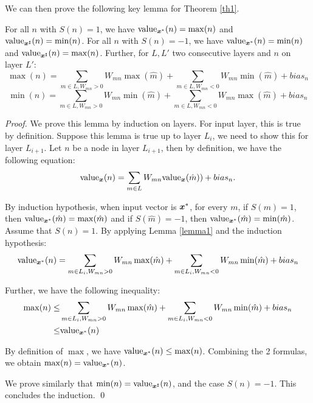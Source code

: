 We can then prove the following key lemma for Theorem \ref{th1}.

\begin{lemma}
	\label{lem:key1}
	\label{lemma2}
For all $n$ with $S(n)=1$, we have ${\textrm{value}}_{\boldsymbol{x}^*}(n) = \max(n)$
and ${\textrm{value}}_{\boldsymbol{x}^{\sharp}}(n) = \min(n)$.
For all $n$ with $S(n)=-1$, we have ${\textrm{value}}_{\boldsymbol{x}^*}(n) = \min(n)$
and ${\textrm{value}}_{\boldsymbol{x}^{\sharp}}(n) = \max(n)$. Further, for $L,L'$ two consecutive layers and $n$ on layer $L'$:
$$\max(n)=\sum_{m \in L, W_{mn}>0}W_{mn} \max(\hat{m}) + \sum_{m \in L, W_{mn}<0}W_{mn} \min(\hat{m}) + bias_n$$
$$\min(n)=\sum_{m \in L, W_{mn}>0}W_{mn} \min(\hat{m}) + \sum_{m \in L, W_{mn}<0}W_{mn} \max(\hat{m}) + bias_n$$

\end{lemma}

\begin{proof}
	We prove this lemma by induction on layers. For input layer, this is true by definition. Suppose this lemma is true up to layer $L_i$, we need to show this for layer $L_{i+1}$. Let $n$ be a node in layer $L_{i+1}$, then by definition, we have the following equation: \begin{align*}
		{\textrm{value}}_{\boldsymbol{x}}(n) = \sum_{m\in L}W_{m n}{\textrm{value}}_{\boldsymbol{x}}(\hat{m})) + bias_n.
	\end{align*}
	
	By induction hypothesis, when input vector is $\boldsymbol{x}^{*}$, for every $m$, if $S(m)=1$, then ${\textrm{value}}_{\boldsymbol{x}^*}(\hat{m})=\max(\hat{m})$ and if $S(\hat{m})=-1$, then ${\textrm{value}}_{\boldsymbol{x}^*}(\hat{m})=\min(\hat{m})$. Assume that $S(n)=1$. By applying Lemma \ref{lemma1} and the induction hypothesis:
	\begin{align*}
		{\textrm{value}}_{\boldsymbol{x}^*}(n) = \sum_{m \in L_i, W_{mn}>0}W_{mn} \max(\hat{m}) + \sum_{m \in L_i, W_{mn}<0}W_{mn} \min(\hat{m}) + bias_n\\
	\end{align*}
	


	Further, we have the following inequality:
	\begin{align*}
		\max(n)\leq & \sum_{m \in L_i, W_{mn }>0}W_{mn} \max(\hat{m}) + \sum_{m \in L_i, W_{mn}<0}W_{mn} \min(\hat{m}) + bias_n\\
		\leq & {\textrm{value}}_{\boldsymbol{x}^*}(n)
	\end{align*}
	
	
	By definition of $\max$, we have ${\textrm{value}}_{\boldsymbol{x}^*}(n) \leq \max(n)$.
	Combining the 2 formulas, we obtain $\max(n)={\textrm{value}}_{\boldsymbol{x}^*}(n)$. 
	
	We prove similarly that $\min(n)={\textrm{value}}_{\boldsymbol{x}^\sharp}(n)$,
	and the case $S(n)=-1$. This concludes the induction. \qed
\end{proof}

